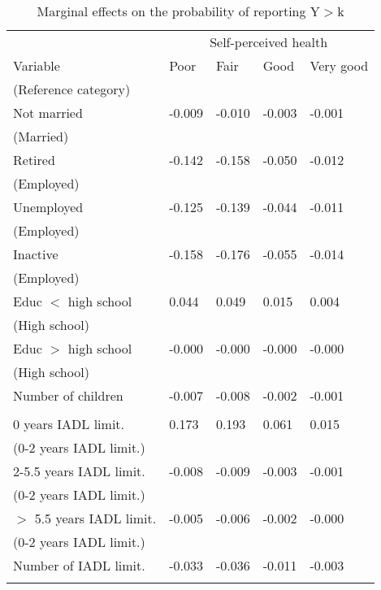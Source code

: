 \documentclass[12pt]{article}
\begin{document}
\begin{table}[h!]
\centering
\footnotesize
\caption*{Marginal effects on the probability of reporting Y$>$k}
\label{table1}
\begin{tabular}{l llll}
\hline
& \multicolumn{4}{c}{Self-perceived health}\\
Variable & Poor & Fair & Good & Very good \\
(Reference category) &&&&\\\hline\hline
Not married                             & -0.009 & -0.010 & -0.003 & -0.001 \\
(Married)                               &&&& \\
\rule{0pt}{3ex}Retired                  & -0.142 & -0.158 & -0.050 & -0.012 \\
(Employed)                              &&&& \\
\rule{0pt}{3ex}Unemployed               & -0.125 & -0.139 & -0.044 & -0.011 \\
(Employed)                              &&&& \\
\rule{0pt}{3ex}Inactive                 & -0.158 & -0.176 & -0.055 & -0.014 \\
(Employed)                              &&&& \\
\rule{0pt}{3ex}Educ $<$ high school     &  0.044 &  0.049 &  0.015 &  0.004 \\
(High school)                           &&&& \\
\rule{0pt}{3ex}Educ $>$ high school     & -0.000 & -0.000 & -0.000 & -0.000 \\
(High school)                           &&&& \\
\rule{0pt}{3ex}Number of children       & -0.007 & -0.008 & -0.002 & -0.001 \\
                                        &&&& \\
\rule{0pt}{3ex}0 years IADL limit.      &  0.173 &  0.193 &  0.061 &  0.015 \\
(0-2 years IADL limit.)                 &&&& \\
\rule{0pt}{3ex}2-5.5 years IADL limit.  & -0.008 & -0.009 & -0.003 & -0.001 \\
(0-2 years IADL limit.)                 &&&& \\
\rule{0pt}{3ex}$>$ 5.5 years IADL limit.& -0.005 & -0.006 & -0.002 & -0.000 \\
(0-2 years IADL limit.)                 &&&& \\
\rule{0pt}{3ex}Number of IADL limit.    & -0.033 & -0.036 & -0.011 & -0.003 \\
                                        &&&& \\
\hline
\end{tabular}
\end{table}
\end{document}
